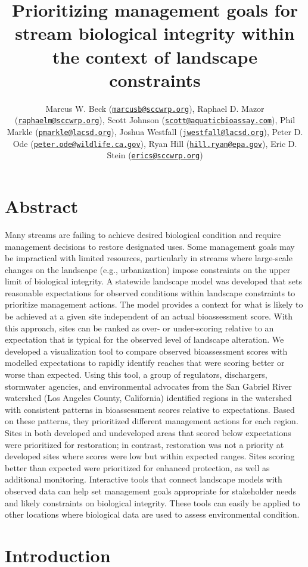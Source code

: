 \documentclass[]{article}
\title{Prioritizing management goals for stream biological integrity within the
context of landscape constraints}
\author{Marcus W. Beck
(\href{mailto:marcusb@sccwrp.org}{\nolinkurl{marcusb@sccwrp.org}}),
Raphael D. Mazor
(\href{mailto:raphaelm@sccwrp.org}{\nolinkurl{raphaelm@sccwrp.org}}),
Scott Johnson
(\href{mailto:scott@aquaticbioassay.com}{\nolinkurl{scott@aquaticbioassay.com}}),
Phil Markle
(\href{mailto:pmarkle@lacsd.org}{\nolinkurl{pmarkle@lacsd.org}}), Joshua
Westfall
(\href{mailto:jwestfall@lacsd.org}{\nolinkurl{jwestfall@lacsd.org}}),
Peter D. Ode
(\href{mailto:peter.ode@wildlife.ca.gov}{\nolinkurl{peter.ode@wildlife.ca.gov}}),
Ryan Hill
(\href{mailto:hill.ryan@epa.gov}{\nolinkurl{hill.ryan@epa.gov}}), Eric
D. Stein (\href{mailto:erics@sccwrp.org}{\nolinkurl{erics@sccwrp.org}})}
\date{}
\begin{document}
\maketitle

\section{Abstract}\label{abstract}

Many streams are failing to achieve desired biological condition and
require management decisions to restore designated uses. Some management
goals may be impractical with limited resources, particularly in streams
where large-scale changes on the landscape (e.g., urbanization) impose
constraints on the upper limit of biological integrity. A statewide
landscape model was developed that sets reasonable expectations for
observed conditions within landscape constraints to prioritize
management actions. The model provides a context for what is likely to
be achieved at a given site independent of an actual bioassessment
score. With this approach, sites can be ranked as over- or under-scoring
relative to an expectation that is typical for the observed level of
landscape alteration. We developed a visualization tool to compare
observed bioassessment scores with modelled expectations to rapidly
identify reaches that were scoring better or worse than expected. Using
this tool, a group of regulators, dischargers, stormwater agencies, and
environmental advocates from the San Gabriel River watershed (Los
Angeles County, California) identified regions in the watershed with
consistent patterns in bioassessment scores relative to expectations.
Based on these patterns, they prioritized different management actions
for each region. Sites in both developed and undeveloped areas that
scored below expectations were prioritized for restoration; in contrast,
restoration was not a priority at developed sites where scores were low
but within expected ranges. Sites scoring better than expected were
prioritized for enhanced protection, as well as additional monitoring.
Interactive tools that connect landscape models with observed data can
help set management goals appropriate for stakeholder needs and likely
constraints on biological integrity. These tools can easily be applied
to other locations where biological data are used to assess
environmental condition.

\section{Introduction}\label{introduction}
\end{document}
